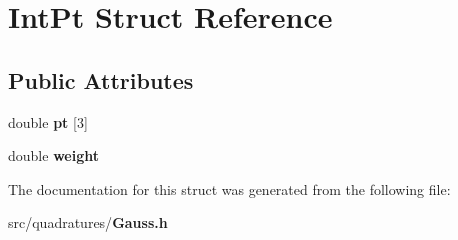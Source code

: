 \section{Int\-Pt Struct Reference}
\label{structIntPt}
\subsection*{Public Attributes}
\begin{DoxyCompactItemize}
\item 
double {\bfseries pt} [3]\label{structIntPt_a4557d4d7289dbe7306ff39bbfee54843}

\item 
double {\bfseries weight}\label{structIntPt_a4e5c6b74864d7f3f9fd984379e44ea5f}

\end{DoxyCompactItemize}


The documentation for this struct was generated from the following file\-:\begin{DoxyCompactItemize}
\item 
src/quadratures/{\bf Gauss.\-h}\end{DoxyCompactItemize}
